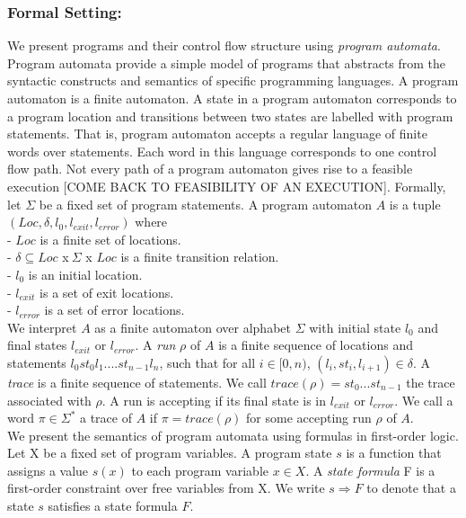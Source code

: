 \documentclass{article}
\begin{document}
\subsubsection*{Formal Setting:}
We present programs and their control flow structure using \textit{program automata}. Program automata provide a simple model of programs that abstracts from the syntactic constructs and semantics of specific programming languages. A program automaton is a finite automaton. A state in a program automaton corresponds to a program location and transitions between two states are labelled with program statements. That is, program automaton accepts a regular language of finite words over statements. Each word in this language corresponds to one control flow path. Not every path of a program automaton gives rise to a feasible execution [COME BACK TO FEASIBILITY OF AN EXECUTION].
Formally, let $\Sigma$ be a fixed set of program statements. A program automaton $A$ is a tuple $(Loc, \delta, l_0, l_{exit},l_{error})$ where\\
- $Loc$ is a finite set of locations.\\
- $\delta \subseteq Loc$ x$\ \Sigma$ x $Loc$ is a finite transition relation.\\
- $l_0$ is an initial location.\\
- $l_{exit}$ is a set of exit locations.\\
- $l_{error}$ is a set of error locations.\\
We interpret $A$ as a finite automaton over alphabet $\Sigma$ with initial state $l_0$ and final states $l_{exit}$ or $l_{error}$. A \textit{run} $\rho$ of $A$ is a finite sequence of locations and statements $l_0st_0l_1....st_{n-1}l_n$, such that for all $i \in [0,n)$,  $(l_i,st_i,l_{i+1}) \in \delta$. A \textit{trace} is a finite sequence of statements. We call $trace(\rho) = st_0...st_{n-1}$ the trace associated with $\rho$. A run is accepting if its final state is in $l_{exit}$ or $l_{error}$. We call a word $\pi \in \Sigma^*$ a trace of $A$ if $\pi= trace(\rho)$ for some accepting run $\rho$ of $A$.\\
We present the semantics of program automata using formulas in first-order logic. Let X be a fixed set of program variables. A program state $s$ is a function that assigns a value $s(x)$ to each program variable $x \in X$. A \textit{state formula} F is a first-order constraint over free variables from X. We write $s \Rightarrow F$ to denote that a state $s$ satisfies a state formula $F$.\\
\end{document}
